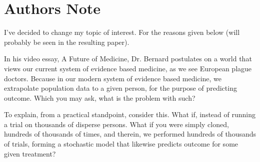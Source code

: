 


\section*{Authors Note}

I've decided to change my topic of interest. For the reasons given below (will probably be seen in the resulting paper).

In his video essay, A Future of Medicine, Dr. Bernard postulates on a world that views our current system of evidence based medicine, as we see European plague doctors. Because in our modern system of evidence based medicine, we extrapolate population data to a given person, for the purpose of predicting outcome. Which you may ask, what is the problem with such? 

To explain, from a practical standpoint, consider this. What if, instead of running a trial on thousands of disperse persons. What if you were simply cloned, hundreds of thousands of times, and therein, we performed hundreds of thousands of trials, forming a stochastic model that likewise predicts outcome for some given treatment?

